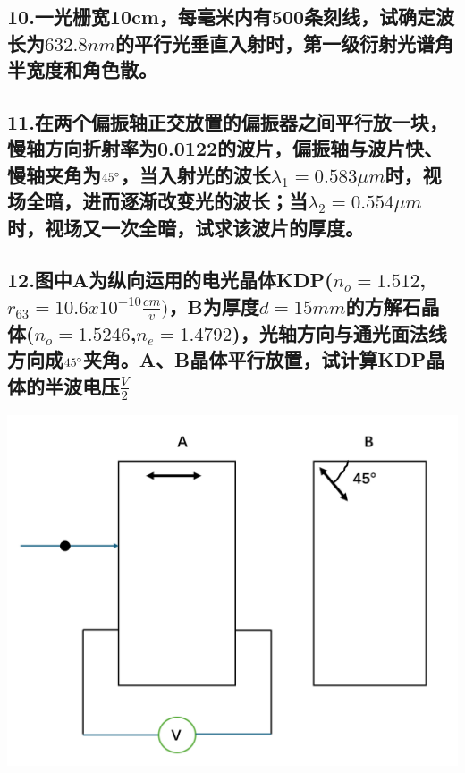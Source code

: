 \documentclass[11pt,a4paper]{article}
\begin{document}
    \subsection*{10.一光栅宽10cm，每毫米内有500条刻线，试确定波长为$632.8nm$的平行光垂直入射时，第一级衍射光谱角半宽度和角色散。}
    \vspace{10mm}
    \subsection*{11.在两个偏振轴正交放置的偏振器之间平行放一块，慢轴方向折射率为0.0122的波片，偏振轴与波片快、慢轴夹角为$45\degree$，当入射光的波长$\lambda_1=0.583\mu m$时，视场全暗，进而逐渐改变光的波长；当$\lambda_2=0.554\mu m$时，视场又一次全暗，试求该波片的厚度。}
    \vspace{10mm}
    \subsection*{12.图中A为纵向运用的电光晶体KDP($n_o=1.512$,$r_63=10.6x10^{-10}\frac{cm}{v})$，B为厚度$d=15mm$的方解石晶体($n_o=1.5246$,$n_e=1.4792$)，光轴方向与通光面法线方向成$45\degree$夹角。A、B晶体平行放置，试计算KDP晶体的半波电压$\frac{V}{2}$}
    \vspace{10mm}
    \includegraphics[scale=0.5]{3.jpg}%
\end{document}

